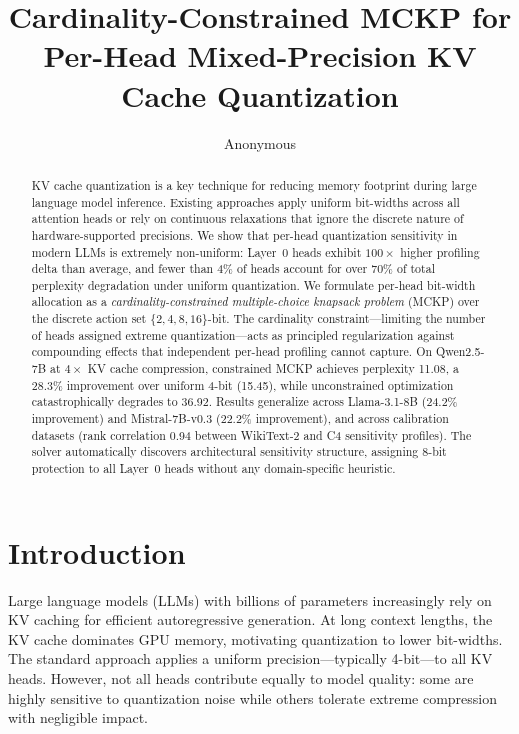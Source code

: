 \documentclass[11pt,a4paper]{article}
\title{Cardinality-Constrained MCKP for Per-Head Mixed-Precision KV Cache Quantization}
\author{Anonymous}
\begin{document}
\maketitle

\begin{abstract}
KV cache quantization is a key technique for reducing memory footprint during large language model inference.
Existing approaches apply uniform bit-widths across all attention heads or rely on continuous relaxations that ignore the discrete nature of hardware-supported precisions.
We show that per-head quantization sensitivity in modern LLMs is extremely non-uniform: Layer~0 heads exhibit $100\times$ higher profiling delta than average, and fewer than 4\% of heads account for over 70\% of total perplexity degradation under uniform quantization.
We formulate per-head bit-width allocation as a \emph{cardinality-constrained multiple-choice knapsack problem} (MCKP) over the discrete action set $\{2,4,8,16\}$-bit.
The cardinality constraint---limiting the number of heads assigned extreme quantization---acts as principled regularization against compounding effects that independent per-head profiling cannot capture.
On Qwen2.5-7B at $4\times$ KV cache compression, constrained MCKP achieves perplexity 11.08, a 28.3\% improvement over uniform 4-bit (15.45), while unconstrained optimization catastrophically degrades to 36.92.
Results generalize across Llama-3.1-8B (24.2\% improvement) and Mistral-7B-v0.3 (22.2\% improvement), and across calibration datasets (rank correlation 0.94 between WikiText-2 and C4 sensitivity profiles).
The solver automatically discovers architectural sensitivity structure, assigning 8-bit protection to all Layer~0 heads without any domain-specific heuristic.
\end{abstract}

\section{Introduction}

Large language models (LLMs) with billions of parameters increasingly rely on KV caching for efficient autoregressive generation.
At long context lengths, the KV cache dominates GPU memory, motivating quantization to lower bit-widths.
The standard approach applies a uniform precision---typically 4-bit---to all KV heads.
However, not all heads contribute equally to model quality: some are highly sensitive to quantization noise while others tolerate extreme compression with negligible impact.
\end{document}
